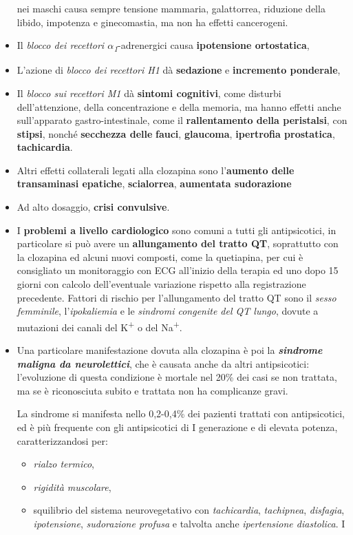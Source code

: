 \begin{itemize}
  nei maschi causa sempre tensione mammaria, galattorrea, riduzione
  della libido, impotenza e ginecomastia, ma non ha effetti cancerogeni.
\item
  Il \emph{blocco dei recettori $\alpha$\textsubscript{1}}-adrenergici causa
  \textbf{ipotensione ortostatica},
\item
  L'azione di \emph{blocco dei recettori H1} dà \textbf{sedazione} e
  \textbf{incremento ponderale},
\item
  Il \emph{blocco sui recettori M1} dà \textbf{sintomi cognitivi}, come
  disturbi dell'attenzione, della concentrazione e della memoria, ma
  hanno effetti anche sull'apparato gastro-intestinale, come il
  \textbf{rallentamento della peristalsi}, con \textbf{stipsi}, nonché
  \textbf{secchezza delle} \textbf{fauci}, \textbf{glaucoma},
  \textbf{ipertrofia prostatica}, \textbf{tachicardia}.
\item
  Altri effetti collaterali legati alla clozapina sono l'\textbf{aumento
  delle transaminasi epatiche}, \textbf{scialorrea}, \textbf{aumentata
  sudorazione}
\item
  Ad alto dosaggio, \textbf{crisi convulsive}.
\item
  I \textbf{problemi a livello cardiologico} sono comuni a tutti gli
  antipsicotici, in particolare si può avere un \textbf{allungamento del
  tratto QT}, soprattutto con la clozapina ed alcuni nuovi composti,
  come la quetiapina, per cui è consigliato un monitoraggio con ECG
  all'inizio della terapia ed uno dopo 15 giorni con calcolo
  dell'eventuale variazione rispetto alla registrazione precedente.
  Fattori di rischio per l'allungamento del tratto QT sono il
  \emph{sesso femminile}, l'\emph{ipokaliemia} e le \emph{sindromi
  congenite del QT lungo}, dovute a mutazioni dei canali del
  K\textsuperscript{+} o del Na\textsuperscript{+}.
\item
  Una particolare manifestazione dovuta alla clozapina è poi la
  \textbf{\emph{sindrome maligna da neurolettici}}, che è causata anche
  da altri antipsicotici: l'evoluzione di questa condizione è mortale
  nel 20\% dei casi se non trattata, ma se è riconosciuta subito e
  trattata non ha complicanze gravi.

  La sindrome si manifesta nello 0,2-0,4\% dei pazienti trattati con
  antipsicotici, ed è più frequente con gli antipsicotici di I
  generazione e di elevata potenza, caratterizzandosi per:

\begin{itemize}
\item
  \emph{rialzo termico},
\item
  \emph{rigidità muscolare},
\item
  squilibrio del sistema neurovegetativo con \emph{tachicardia},
  \emph{tachipnea}, \emph{disfagia}, \emph{ipotensione},
  \emph{sudorazione profusa} e talvolta anche \emph{ipertensione
  diastolica}. I
\end{itemize}


\end{itemize}
